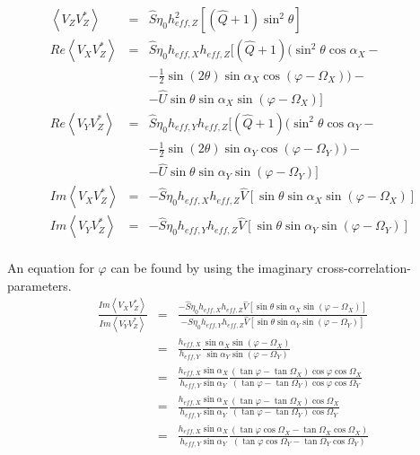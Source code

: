 \documentclass[a4paper,10pt]{thesis}
\begin{document}
\begin{eqnarray}
\left\langle V_Z V_Z^{*} \right\rangle &=& \hat{S}\eta_0 h_{eff,Z}^2[(\hat{Q}+1) \sin^2 \theta]   \\
Re \left\langle V_X V_Z^{*}\right\rangle &=& \hat{S}\eta_0 h_{eff,X} h_{eff,Z}[(\hat{Q}+1) (\sin^2 \theta \cos \alpha_X  - \\
& & - \frac{1}{2}  \sin(2\theta) \sin \alpha_X  \cos(\varphi - \Omega_X))  - \nonumber \\
& & -\hat{U} \sin \theta \sin \alpha_X  \sin (\varphi - \Omega_X)   ]\nonumber \\
Re \left\langle V_Y V_Z^{*}\right\rangle &=& \hat{S}\eta_0 h_{eff,Y} h_{eff,Z}[(\hat{Q}+1) (\sin^2 \theta \cos \alpha_Y  - \\
& & - \frac{1}{2}  \sin(2\theta) \sin \alpha_Y  \cos(\varphi - \Omega_Y))  - \nonumber \\
& & -\hat{U} \sin \theta \sin \alpha_Y  \sin (\varphi - \Omega_Y)   ]\nonumber \\
Im \left\langle V_X V_Z^{*}\right\rangle &=&  -\hat{S}\eta_0 h_{eff,X} h_{eff,Z} \hat{V}[ \sin \theta \sin \alpha_X  \sin (\varphi - \Omega_X) ] \\
Im \left\langle V_Y V_Z^{*}\right\rangle &=&  -\hat{S}\eta_0 h_{eff,Y} h_{eff,Z} \hat{V}[ \sin \theta \sin \alpha_Y  \sin (\varphi - \Omega_Y) ]
\end{eqnarray}

\paragraph*{}
An equation for $\varphi$ can be found by using the imaginary cross-correlation-parameters.
\begin{eqnarray}
\frac{Im \left\langle V_X V_Z^{*}\right\rangle }{Im \left\langle V_Y V_Z^{*}\right\rangle}&=&\frac{- \hat{S}\eta_0 h_{eff,X} h_{eff,Z} \hat{V}[ \sin \theta \sin \alpha_X  \sin (\varphi - \Omega_X) ]}{- \hat{S}\eta_0 h_{eff,Y} h_{eff,Z} \hat{V}[ \sin \theta \sin \alpha_Y  \sin (\varphi - \Omega_Y) ] }\\
&=&\frac{h_{eff,X}}{h_{eff,Y}}\frac{ \sin \alpha_X  \sin (\varphi - \Omega_X) }{ \sin \alpha_Y  \sin (\varphi - \Omega_Y)  }\\
&=&\frac{h_{eff,X} \sin \alpha_X}{h_{eff,Y} \sin \alpha_Y}\frac{(\tan \varphi -\tan \Omega_X)  \cos \varphi \cos \Omega_X}{( \tan \varphi -\tan \Omega_Y) \cos \varphi \cos  \Omega_Y  }\\
&=&\frac{h_{eff,X} \sin \alpha_X}{h_{eff,Y} \sin \alpha_Y}\frac{(\tan \varphi -\tan \Omega_X)  \cos \Omega_X}{( \tan \varphi -\tan \Omega_Y) \cos  \Omega_Y  } \\
&=&\frac{h_{eff,X} \sin \alpha_X}{h_{eff,Y} \sin \alpha_Y}\frac{(\tan \varphi \cos \Omega_X-\tan \Omega_X \cos \Omega_X) }{( \tan \varphi \cos \Omega_Y-\tan \Omega_Y \cos \Omega_Y) }
\end{eqnarray}
\end{document}
